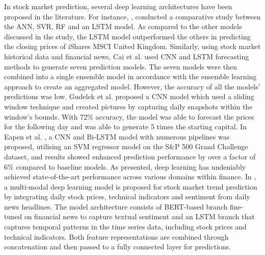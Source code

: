 \documentclass[preprint,12pt]{elsarticle}
\begin{document}
In stock market prediction, several deep learning architectures have been proposed in the literature. For instance, \citep{nikou2019stock}, conducted a comparative study between the ANN, SVR, RF and an LSTM model. As compared to the other models discussed in the study, the LSTM model outperformed the others in predicting the closing prices of iShares MSCI United Kingdom. Similarly, using stock market historical data and financial news, Cai et al. \citep{cai2018financial} used CNN and LSTM forecasting methods to generate seven prediction models. The seven models were then combined into a single ensemble model in accordance with the ensemble learning approach to create an aggregated model. However, the accuracy of all the models' predictions was low. Gudelek et al. \citep{gudelek2017deep} proposed a CNN model which used a sliding window technique and created pictures by capturing daily snapshots within the window's bounds. With 72\% accuracy, the model was able to forecast the prices for the following day and was able to generate 5 times the starting capital. In Eapen et al. \citep{eapen2019novel}, a CNN and Bi-LSTM model with numerous pipelines was proposed, utilising an SVM regressor model on the S\&P 500 Grand Challenge dataset, and results showed enhanced prediction performance by over a factor of 6\% compared to baseline models. As presented, deep learning has undeniably achieved state-of-the-art performance across various domains within finance. In \citep{chen_deep_2024}, a multi-modal deep learning model is proposed for stock market trend prediction by integrating daily stock prices, technical indicators and sentiment from daily news headlines. The model architecture consists of BERT-based branch fine-tuned on financial news to capture textual sentiment and an LSTM branch that captures temporal patterns in the time series data, including stock prices and technical indicators. Both feature representations are combined through concatenation and then passed to a fully connected layer for predictions.
\end{document}
